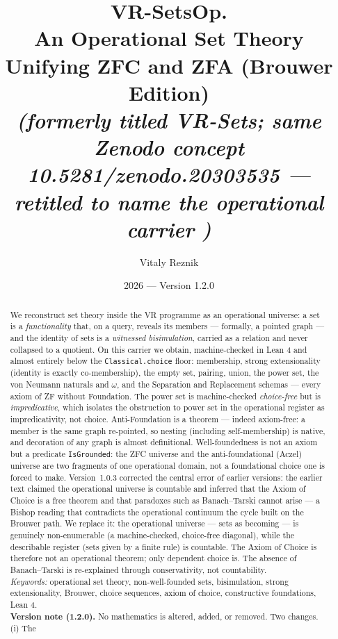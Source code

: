 \documentclass[11pt]{article}
\title{\textbf{VR-SetsOp.}\\[2pt]
\large An Operational Set Theory Unifying ZFC and ZFA (Brouwer Edition)\\[2pt]
\normalsize \emph{(formerly titled VR-Sets; same Zenodo concept 10.5281/zenodo.20303535 --- retitled to name the operational carrier \OpSet{})}}
\author{Vitaly Reznik}
\date{2026 --- Version 1.2.0}
\theoremstyle{remark}
\begin{document}
\maketitle

\begin{abstract}
We reconstruct set theory inside the VR programme as an operational universe: a set is a
\emph{functionality} that, on a query, reveals its members --- formally, a pointed graph --- and
the identity of sets is a \emph{witnessed bisimulation}, carried as a relation and never collapsed
to a quotient. On this carrier we obtain, machine-checked in Lean 4 and almost entirely below the
\texttt{Classical.choice} floor: membership, strong extensionality (identity is exactly
co-membership), the empty set, pairing, union, the power set, the von Neumann naturals and $\omega$,
and the Separation and Replacement schemas --- every axiom of ZF without Foundation. The power set is
machine-checked \emph{choice-free} but is \emph{impredicative}, which isolates the obstruction to
power set in the operational register as impredicativity, not choice. Anti-Foundation is a theorem ---
indeed axiom-free: a member is the same graph re-pointed, so nesting (including self-membership) is
native, and decoration of any graph is almost definitional. Well-foundedness is not an axiom
but a predicate
\texttt{IsGrounded}: the ZFC universe and the anti-foundational (Aczel) universe are two fragments
of one operational domain, not a foundational choice one is forced to make. Version~1.0.3 corrected
the central error of earlier versions: the earlier text claimed the operational universe is countable
and inferred that the Axiom of Choice is a free theorem and that paradoxes such as Banach--Tarski
cannot arise --- a Bishop reading that contradicts the operational continuum the cycle built on the
Brouwer path. We replace it: the operational universe --- sets as becoming --- is genuinely
non-enumerable (a machine-checked, choice-free diagonal), while the describable register (sets given
by a finite rule) is countable. The Axiom of Choice is therefore not an operational theorem; only
dependent choice is. The absence of Banach--Tarski is re-explained through conservativity, not
countability.
\\[3pt]
\emph{Keywords:} operational set theory, non-well-founded sets, bisimulation, strong
extensionality, Brouwer, choice sequences, axiom of choice, constructive foundations, Lean 4.
\\[3pt]
\textbf{Version note (1.2.0).} No mathematics is altered, added, or removed. Two changes. (i) The

\end{abstract}
\end{document}
